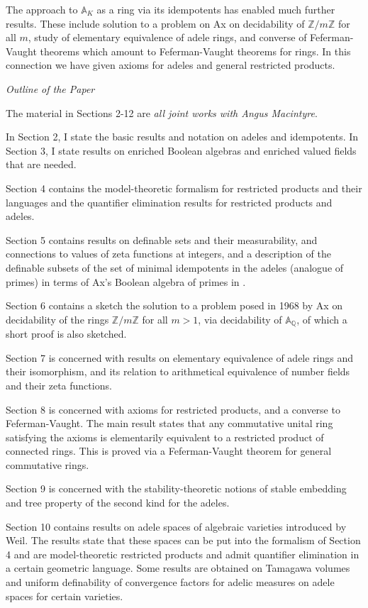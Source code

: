 \documentclass[12pt]{amsart}
\def\A{\mathbb{A}}
\def\Z{\mathbb{Z}}
\def\Q{\mathbb{Q}}
\numberwithin{equation}{section}
\begin{document}
The approach to $\A_K$ as a ring via its idempotents has enabled much further results. These include solution to a problem on Ax on decidability of $\Z/m\Z$ for all $m$, study of elementary equivalence of adele rings, and converse of Feferman-Vaught theorems which amount to Feferman-Vaught theorems for rings. In this connection we have given axioms for adeles and 
general restricted products. 

\medskip

{\it Outline of the Paper}

\medskip

The material in Sections 2-12 are {\it all joint works with Angus Macintyre}.

In Section 2, I state the basic results and notation on adeles and idempotents. In Section 3, I state results on enriched Boolean algebras and enriched valued fields that are needed. 

Section 4 contains the model-theoretic formalism for restricted products and their languages and the 
quantifier elimination results for restricted products and adeles. 

Section 5 contains results on definable sets and their measurability, and connections to values of zeta functions at integers, and a description of the definable subsets of the set of minimal idempotents in the adeles (analogue of primes) in terms of Ax's Boolean algebra of primes in \cite{ax}.

Section 6 contains a sketch the solution to a problem posed in 1968 by Ax \cite{ax} on decidability of the rings $\Z/m\Z$ for all $m>1$, via decidability of $\A_{\Q}$, of which a short proof is also sketched. 

Section 7 is concerned with results on elementary equivalence of adele rings and their isomorphism, and its relation to 
arithmetical equivalence of number fields and their zeta functions.

Section 8 is concerned with axioms for restricted products, and a converse to Feferman-Vaught. 
The main result states that any commutative unital ring satisfying the axioms is elementarily equivalent to a restricted product of connected rings. This is proved via a Feferman-Vaught theorem for general commutative rings.

Section 9 is concerned with the stability-theoretic notions of stable embedding and tree property of the second kind for the adeles.

Section 10 contains results on adele spaces of algebraic varieties introduced by Weil. The results state that these spaces can be put into the formalism of Section 4 
and are model-theoretic restricted products and admit quantifier elimination in a certain geometric language. Some results are obtained on Tamagawa volumes and uniform definability of convergence factors for adelic measures on adele spaces for certain varieties.
\end{document}
